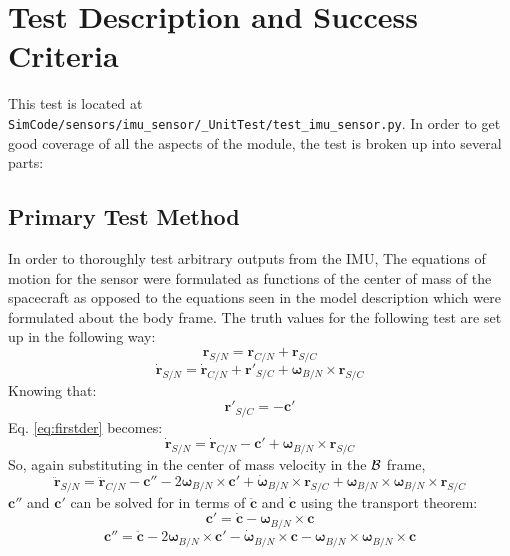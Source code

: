 \section{Test Description and Success Criteria}
This test is located at {\tt SimCode/sensors/imu\_sensor/\_UnitTest/test\_imu\_sensor.py}. In order to get good coverage of all the aspects of the module, the test is broken up into several parts: \par

\subsection{Primary Test Method}
In order to thoroughly test arbitrary outputs from the IMU, The equations of motion for the sensor were formulated as functions of the center of mass of the spacecraft as opposed to the equations seen in the model description which were formulated about the body frame. The truth values for the following test are set up in the following way:
\begin{equation}
{\bm{r}}_{S/N} = {\bm{r}}_{C/N} + {\bm{r}}_{S/C}
\end{equation}
\begin{equation}
\dot{{\bm{r}}}_{S/N} = \dot{{\bm{r}}}_{C/N} + {\bm{r}}'_{S/C} + \bm{\omega}_{B/N} \times {\bm{r}}_{S/C}
\label{eq:firstder}
\end{equation}
Knowing that:
\begin{equation}
{\bm{r}}'_{S/C} = - \bm{c}'
\end{equation}
Eq. \ref{eq:firstder} becomes:
\begin{equation}
	\dot{{\bm{r}}}_{S/N} = \dot{{\bm{r}}}_{C/N} - \bm{c}' + \bm{\omega}_{B/N} \times {\bm{r}}_{S/C}
\end{equation}
So, again substituting in the center of mass velocity in the $\cal{B}$ frame,
\begin{equation}
\ddot{{\bm{r}}}_{S/N} = \ddot{{\bm{r}}}_{C/N} - \bm{c}'' - 2\bm{\omega}_{B/N} \times \bm{c}'  + \dot{\bm{\omega}}_{B/N} \times {\bm{r}}_{S/C} + \bm{\omega}_{B/N} \times \bm{\omega}_{B/N} \times {\bm{r}}_{S/C}
\label{eq:SN}
\end{equation}
$ \bm{c}''$ and $ \bm{c}'$ can be solved for in terms of $\ddot{\bm{c}}$ and $\dot{\bm{c}}$ using the transport theorem:
\begin{equation}
\bm{c}'   = \dot{\bm{c}} - \bm{\omega}_{B/N} \times \bm{c}
\end{equation}
\begin{equation}
\bm{c}''  = \ddot{\bm{c}}  - 2\bm{\omega}_{B/N} \times \bm{c}' - \dot{\bm{\omega}}_{B/N} \times \bm{c}  -\bm{\omega}_{B/N} \times \bm{\omega}_{B/N} \times \bm{c}
\end{equation}
